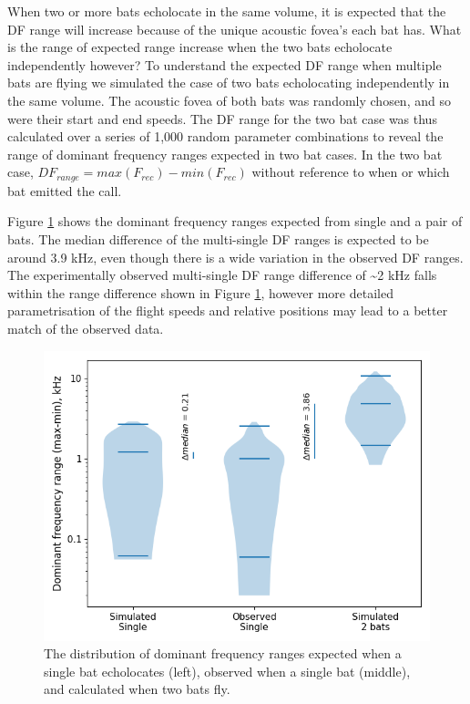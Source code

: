 \documentclass[
]{book}
\begin{document}
When two or more bats echolocate in the same volume, it is expected that the DF range will increase because of the unique acoustic fovea's each bat has. What is the range of expected range increase when the two bats echolocate independently however? To understand the expected DF range when multiple bats are flying we simulated the case of two bats echolocating independently in the same volume. The acoustic fovea of both bats was randomly chosen, and so were their start and end speeds. The DF range for the two bat case was thus calculated over a series of 1,000 random parameter combinations to reveal the range of dominant frequency ranges expected in two bat cases. In the two bat case, \(DF_{range}=max(F_{rec})-min(F_{rec})\) without reference to when or which bat emitted the call.

Figure \ref{fig:multidomfreqsim} shows the dominant frequency ranges expected from single and a pair of bats. The median difference of the multi-single DF ranges is expected to be around 3.9 kHz, even though there is a wide variation in the observed DF ranges. The experimentally observed multi-single DF range difference of \textasciitilde2 kHz falls within the range difference shown in Figure \ref{fig:multidomfreqsim}, however more detailed parametrisation of the flight speeds and relative positions may lead to a better match of the observed data.

\begin{figure}
\includegraphics[width=1\linewidth]{original_papers/hbc-paper/combined_analysis/domfreqrange_singlemultisim} \caption{\label{fig:multidomfreqsim} The distribution of dominant frequency ranges expected when a single bat echolocates (left), observed when a single bat (middle), and calculated when two bats fly.}\label{fig:multidomfreqsim}
\end{figure}
\end{document}
